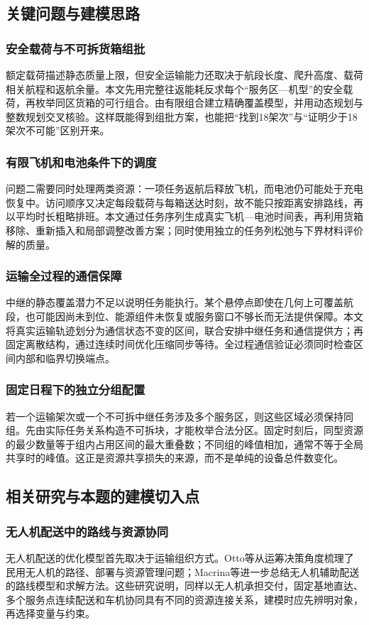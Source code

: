 \documentclass[withoutpreface,colorprint]{format}
\numberwithin{equation}{section}
\numberwithin{figure}{section}
\numberwithin{table}{section}
\begin{document}
\subsection{关键问题与建模思路}
\subsubsection{安全载荷与不可拆货箱组批}
额定载荷描述静态质量上限，但安全运输能力还取决于航段长度、爬升高度、载荷相关航程和返航余量。本文先用完整往返能耗反求每个“服务区—机型”的安全载荷，再枚举同区货箱的可行组合。由有限组合建立精确覆盖模型，并用动态规划与整数规划交叉核验。这样既能得到组批方案，也能把“找到18架次”与“证明少于18架次不可能”区别开来。

\subsubsection{有限飞机和电池条件下的调度}
问题二需要同时处理两类资源：一项任务返航后释放飞机，而电池仍可能处于充电恢复中。访问顺序又决定每段载荷与每箱送达时刻，故不能只按距离安排路线，再以平均时长粗略排班。本文通过任务序列生成真实飞机—电池时间表，再利用货箱移除、重新插入和局部调整改善方案；同时使用独立的任务列松弛与下界材料评价解的质量。

\subsubsection{运输全过程的通信保障}
中继的静态覆盖潜力不足以说明任务能执行。某个悬停点即使在几何上可覆盖航段，也可能因尚未到位、能源组件未恢复或服务窗口不够长而无法提供保障。本文将真实运输轨迹划分为通信状态不变的区间，联合安排中继任务和通信提供方；再固定离散结构，通过连续时间优化压缩同步等待。全过程通信验证必须同时检查区间内部和临界切换端点。

\subsubsection{固定日程下的独立分组配置}
若一个运输架次或一个不可拆中继任务涉及多个服务区，则这些区域必须保持同组。先由实际任务关系构造不可拆块，才能枚举合法分区。固定时刻后，同型资源的最少数量等于组内占用区间的最大重叠数；不同组的峰值相加，通常不等于全局共享时的峰值。这正是资源共享损失的来源，而不是单纯的设备总件数变化。


\subsection{相关研究与本题的建模切入点}
\label{sec:research_position}
\subsubsection{无人机配送中的路线与资源协同}
无人机配送的优化模型首先取决于运输组织方式。Otto等从运筹决策角度梳理了民用无人机的路径、部署与资源管理问题\cite{otto2018}；Macrina等进一步总结无人机辅助配送的路线模型和求解方法\cite{macrina2020}。这些研究说明，同样以无人机承担交付，固定基地直达、多个服务点连续配送和车机协同具有不同的资源连接关系，建模时应先辨明对象，再选择变量与约束。
\end{document}
